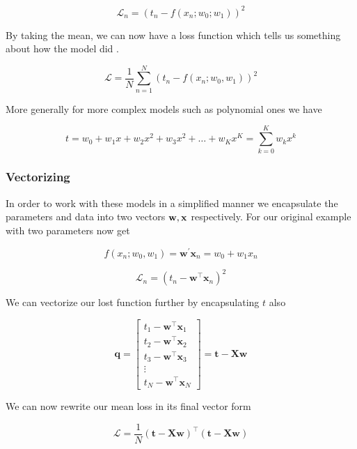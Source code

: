 			$$\mathcal{L}_{n}=\left(t_{n}-f\left(x_{n} ; w_{0} ; w_{1}\right)\right)^{2}$$


			\par{By taking the mean, we can now have a loss function which tells us something about how the model did .}

			$$\mathcal{L}=\frac{1}{N} \sum_{n=1}^{N}\left(t_{n}-f\left(x_{n} ; w_{0}, w_{1}\right)\right)^{2}$$

			\par{More generally for more complex models such as polynomial ones we have}

			$$t=w_{0}+w_{1} x+w_{2} x^{2}+w_{3} x^{2}+\ldots+w_{K} x^{K}=\sum_{k=0}^{K} w_{k} x^{k}$$

			\subsubsection{Vectorizing}

			\par{In order to work with these models in a simplified manner we encapsulate the parameters and data into two vectors $\mathbf{w} , \mathbf{x}$ respectively. For our original example with two parameters now get }

			$$f\left(x_{n} ; w_{0}, w_{1}\right)=\mathbf{w}^{\prime} \mathbf{x}_{n}=w_{0}+w_{1} x_{n}$$

			$$\mathcal{L}_{n}=\left(t_{n}-\mathbf{w}^{\top} \mathbf{x}_{n}\right)^{2}$$

			\par{We can vectorize our lost function further by encapsulating $t$ also}

			$$\mathbf{q}=\left[\begin{array}{c}t_{1}-\mathbf{w}^{\top} \mathbf{x}_{1} \\ t_{2}-\mathbf{w}^{\top} \mathbf{x}_{2} \\ t_{3}-\mathbf{w}^{\top} \mathbf{x}_{3} \\ \vdots \\ t_{N}-\mathbf{w}^{\top} \mathbf{x}_{N}\end{array}\right]=\mathbf{t}-\mathbf{X} \mathbf{w}$$

			\par{We can now rewrite our mean loss in its final vector form}

			$$\mathcal{L}=\frac{1}{N}(\mathbf{t}-\mathbf{X} \mathbf{w})^{\top}(\mathbf{t}-\mathbf{X} \mathbf{w})$$


